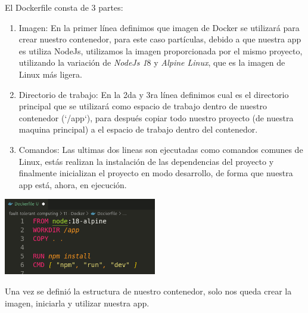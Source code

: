 \documentclass{dense_template}
\begin{document}
El Dockerfile consta de 3 partes:
\begin{enumerate}
    \item Imagen: En la primer línea definimos que imagen de Docker se utilizará para crear nuestro contenedor, para este caso partículas, debido a que nuestra app es utiliza NodeJs, utilizamos la imagen proporcionada por el mismo proyecto, utilizando la variación de \textit{NodeJs 1}8 y \textit{Alpine Linux}, que es la imagen de Linux más ligera.
    \item Directorio de trabajo: En la 2da y 3ra línea definimos cual es el directorio principal que se utilizará como espacio de trabajo dentro de nuestro contenedor (`/app`), para después copiar todo nuestro proyecto (de nuestra maquina principal) a el espacio de trabajo dentro del contenedor.
    \item Comandos: Las ultimas dos lineas son ejecutadas como comandos comunes de Linux, estás realizan la instalación de las dependencias del proyecto y finalmente inicializan el proyecto en modo desarrollo, de forma que nuestra app está, ahora, en ejecución.
\end{enumerate}
\begin{center}
    \vspace{1cm}
    \includegraphics[width=0.5\textwidth]{Dockerfile.png}
 \end{center}
 Una vez se definió la estructura de nuestro contenedor, solo nos queda crear la imagen, iniciarla y utilizar nuestra app.
\end{document}
